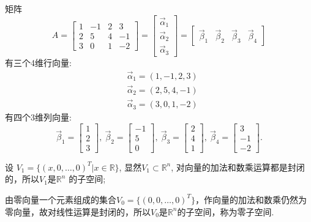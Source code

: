 \begin{eg}
矩阵$$A=\begin{bmatrix}1&-1&2&3\\2&5&4&-1\\3&0&1&-2\end{bmatrix}=\begin{bmatrix}
\vec{\alpha}_1\\ \vec{\alpha}_2\\ \vec{\alpha}_3\end{bmatrix}=\begin{bmatrix} \vec{\beta}_1&\vec{\beta}_2&\vec{\beta}_3&\vec{\beta}_4\end{bmatrix}$$
有三个4维行向量:
\begin{displaymath}\begin{aligned}
&\vec{\alpha}_1=(1,-1,2,3)\\
&\vec{\alpha}_2=(2,5,4,-1)\\
&\vec{\alpha}_3=(3,0,1,-2)\end{aligned}
\end{displaymath}
有四个3维列向量:
\begin{displaymath}
\vec{\beta}_1=\begin{bmatrix}1\\2\\3\end{bmatrix},\ \vec{\beta}_2=\begin{bmatrix}-1\\5\\0\end{bmatrix},\ \vec{\beta}_3=\begin{bmatrix}2\\4\\1\end{bmatrix},\ \vec{\beta}_4=\begin{bmatrix}3\\-1\\-2\end{bmatrix}.
\end{displaymath}
\end{eg}

\begin{eg}
设 $V_1=\{(x,0,\dots,0)^T|x\in\mathbb{R}\}$, 显然$V_1\subset \mathbb{R}^n$, 对向量的加法和数乘运算都是封闭的，所以$V_1$是$\mathbb{R}^n$ 的子空间;

由零向量一个元素组成的集合$V_0=\{(0,0,\dots, 0)^T\}$，作向量的加法和数乘仍然为零向量，故对线性运算是封闭的，所以$V_0$是$\mathbb{R}^n$的子空间，称为零子空间.
\end{eg}



